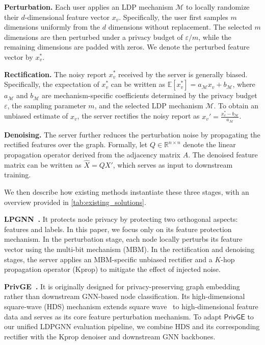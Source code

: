 \documentclass[conference,compsoc]{IEEEtran}
\theoremstyle{boldplain}
\theoremstyle{bolddefinition}
\theoremstyle{remark}
\newcommand{\mypara}[1]{\noindent\textbf{#1.}\xspace}
\newcommand{\kprop}{Kprop\xspace}
\newcommand{\ldpgnn}{LDPGNN\xspace}
\newcommand{\privge}{\ensuremath{\mathsf{PrivGE}}\xspace}
\newcommand{\mbmm}{MBM\xspace}
\newcommand{\hdsm}{HDS\xspace}
\begin{document}
\vspace{0.1cm}

\mypara{Perturbation}
Each user applies an LDP mechanism $\mathcal{M}$ to locally randomize their $d$-dimensional feature vector $x_v$. 
Specifically, the user first samples $m$ dimensions uniformly from the $d$ dimensions without replacement. 
The selected $m$ dimensions are then perturbed under a privacy budget of $\varepsilon/m$, while the remaining dimensions are padded with zeros. 
We denote the perturbed feature vector by $x_v^*$. 

\vspace{0.1cm}
\mypara{Rectification}
The noisy report $x_v^*$ received by the server is generally biased. 
Specifically, the expectation of $x_v^*$ can be written as $\mathbb{E}[x_v^*] = a_{\mathcal M}x_v + b_{\mathcal M}$, where $a_{\mathcal M}$ and $b_{\mathcal M}$ are mechanism-specific coefficients determined by the privacy budget $\varepsilon$, the sampling parameter $m$, and the selected LDP mechanism $\mathcal {M}$. 
To obtain an unbiased estimate of $x_v$, the server rectifies the noisy report as $x_v' = \frac{x_v^* - b_{\mathcal M}}{a_{\mathcal M}}$.


\vspace{0.1cm}
\mypara{Denoising}
The server further reduces the perturbation noise by propagating the rectified features over the graph.
Formally, let $Q \in \mathbb{R}^{n \times n}$ denote the linear propagation operator derived from the adjacency matrix $A$.
The denoised feature matrix can be written as $\widehat{X}=QX'$, which serves as input to downstream training.

\vspace{0.1cm}

We then describe how existing methods instantiate these three stages, with an overview provided in \autoref{tab:existing_solutions}.

\vspace{0.1cm}
\mypara{LPGNN~\cite{lpgNN}}
It protects node privacy by protecting two orthogonal aspects: features and labels. 
In this paper, we focus only on its feature protection mechanism. 
In the perturbation stage, each node locally perturbs its feature vector using the multi-bit mechanism (\mbmm).
In the rectification and denoising stages, the server applies an \mbmm-specific unbiased rectifier and a $K$-hop propagation operator (\kprop) to mitigate the effect of injected noise.

\vspace{0.1cm}
\mypara{PrivGE~\cite{privge}}
It is originally designed for privacy-preserving graph embedding rather than downstream GNN-based node classification. 
Its high-dimensional square-wave (\hdsm) mechanism extends square wave~\cite{li2020estimating} to high-dimensional feature data and serves as its core feature perturbation mechanism. 
To adapt \privge to our unified \ldpgnn evaluation pipeline, we combine \hdsm and its corresponding rectifier with the \kprop denoiser and downstream GNN backbones.
\end{document}
